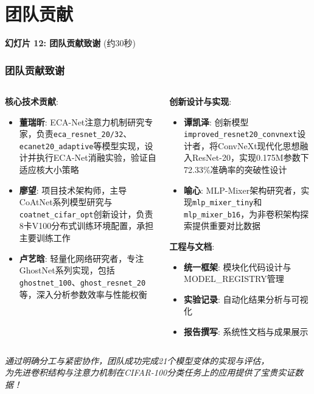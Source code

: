 \documentclass[10pt]{beamer}
\begin{document}
\section{团队贡献}
\scriptsize
\begin{frame}{\textbf{幻灯片 12: 团队贡献致谢} (约30秒)}
\frametitle{团队贡献致谢}

\begin{columns}[T]
    \begin{column}{0.48\textwidth}
        \textbf{核心技术贡献}:
        \begin{itemize}
            \item \textbf{董瑞昕}: ECA-Net注意力机制研究专家，负责\texttt{eca\_resnet\_20/32}、\texttt{ecanet20\_adaptive}等模型实现，设计并执行ECA-Net消融实验，验证自适应核大小策略
            \item \textbf{廖望}: 项目技术架构师，主导CoAtNet系列模型研究与\texttt{coatnet\_cifar\_opt}创新设计，负责8卡V100分布式训练环境配置，承担主要训练工作
            \item \textbf{卢艺晗}: 轻量化网络研究者，专注GhostNet系列实现，包括\texttt{ghostnet\_100}、\texttt{ghost\_resnet\_20}等，深入分析参数效率与性能权衡
        \end{itemize}
    \end{column}
    \begin{column}{0.48\textwidth}
        \textbf{创新设计与实现}:
        \begin{itemize}
            \item \textbf{谭凯泽}: 创新模型\texttt{improved\_resnet20\_convnext}设计者，将ConvNeXt现代化思想融入ResNet-20，实现0.175M参数下72.33\%准确率的突破性设计
            \item \textbf{喻心}: MLP-Mixer架构研究者，实现\texttt{mlp\_mixer\_tiny}和\texttt{mlp\_mixer\_b16}，为非卷积架构探索提供重要对比数据
        \end{itemize}
        
        \vspace{0.5em}
        \textbf{工程与文档}:
        \begin{itemize}
            \item \textbf{统一框架}: 模块化代码设计与MODEL\_REGISTRY管理
            \item \textbf{实验记录}: 自动化结果分析与可视化
            \item \textbf{报告撰写}: 系统性文档与成果展示
        \end{itemize}
    \end{column}
\end{columns}

\vspace{0.8em}
\centering
\textit{通过明确分工与紧密协作，团队成功完成21个模型变体的实现与评估，\\
为先进卷积结构与注意力机制在CIFAR-100分类任务上的应用提供了宝贵实证数据！}

\end{frame}
\end{document}

